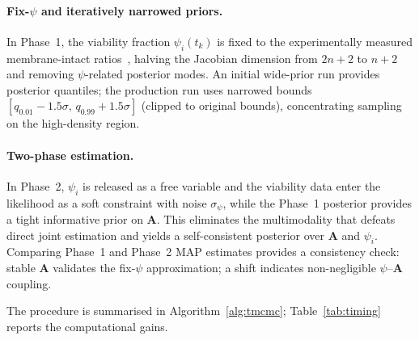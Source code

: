 \documentclass[11pt,a4paper]{article}
\begin{document}
\paragraph{Fix-$\psi$ and iteratively narrowed priors.}
In Phase~1, the viability fraction $\psi_i(t_k)$ is fixed to the experimentally measured membrane-intact ratios~\cite{Heine2025PeriImplant}, halving the Jacobian dimension from $2n+2$ to $n+2$ and removing $\psi$-related posterior modes.
An initial wide-prior run provides posterior quantiles; the production run uses narrowed bounds $[q_{0.01}-1.5\sigma,\,q_{0.99}+1.5\sigma]$ (clipped to original bounds), concentrating sampling on the high-density region.

\paragraph{Two-phase estimation.}
In Phase~2, $\psi_i$ is released as a free variable and the viability data enter the likelihood as a soft constraint with noise $\sigma_\psi$, while the Phase~1 posterior provides a tight informative prior on $\mathbf{A}$.
This eliminates the multimodality that defeats direct joint estimation and yields a self-consistent posterior over $\mathbf{A}$ and $\psi_i$.
Comparing Phase~1 and Phase~2 MAP estimates provides a consistency check: stable $\mathbf{A}$ validates the fix-$\psi$ approximation; a shift indicates non-negligible $\psi$--$\mathbf{A}$ coupling.

The procedure is summarised in Algorithm~\ref{alg:tmcmc}; Table~\ref{tab:timing} reports the computational gains.
\end{document}
